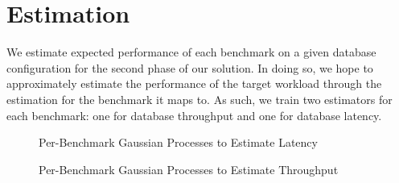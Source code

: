 \section{Estimation} \label{sec:estimation}

We estimate expected performance of each benchmark on a given database
configuration for the second phase of our solution. In doing so, we
hope to approximately estimate the performance of the target workload
through the estimation for the benchmark it maps to. As such, we train
two estimators for each benchmark: one for database throughput and one
for database latency.

\begin{figure}
    \centering
    \caption{Per-Benchmark Gaussian Processes to Estimate Latency}
    \label{fig:gp_r2_latency}
\end{figure}

\begin{figure}
    \centering
    \caption{Per-Benchmark Gaussian Processes to Estimate Throughput}
    \label{fig:gp_r2_throughput}
\end{figure}

